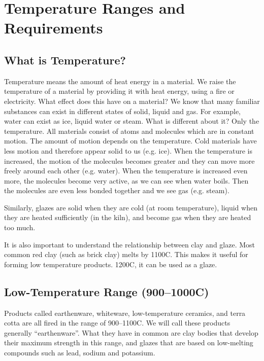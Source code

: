 \chapter{Temperature Ranges and Requirements}
\section{What is Temperature?}
Temperature means the amount of heat energy in a material. We raise the 
temperature of a material by providing it with heat energy, using a fire or 
electricity. What effect does this have on a material? We know that many 
familiar substances can exist in different states of solid, liquid and gas. For 
example, water can exist as ice, liquid water or steam. What is different about 
it? Only the temperature. All materials consist of atoms and molecules which 
are in constant motion. The amount of motion depends on the temperature. Cold 
materials have less motion and therefore appear solid to us (e.g. ice). When 
the temperature is increased, the motion of the molecules becomes greater and 
they can move more freely around each other (e.g. water). When the temperature 
is increased even more, the molecules become very active, as we can see when 
water boils. Then the molecules are even less bonded together and we see gas 
(e.g. steam).

Similarly, glazes are solid when they are cold (at room temperature), liquid 
when they are heated sufficiently (in the kiln), and become gas when they are 
heated too much.

It is also important to understand the relationship between clay and glaze. 
Most common red clay (such as brick clay) melts by 1100\degree C. This makes it 
useful for forming low temperature products. 1200\degree C, it can be used as a 
glaze.
\section{Low-Temperature Range (900--1000\degree C)}
Products called earthenware, whiteware, low-temperature ceramics, and terra 
cotta are all fired in the range of 900--1100\degree C. We will call these 
products 
generally ``earthenware''. What they have in common are clay bodies that develop 
their maximum strength in this range, and glazes that are based on low-melting 
compounds such as lead, sodium and potassium.
